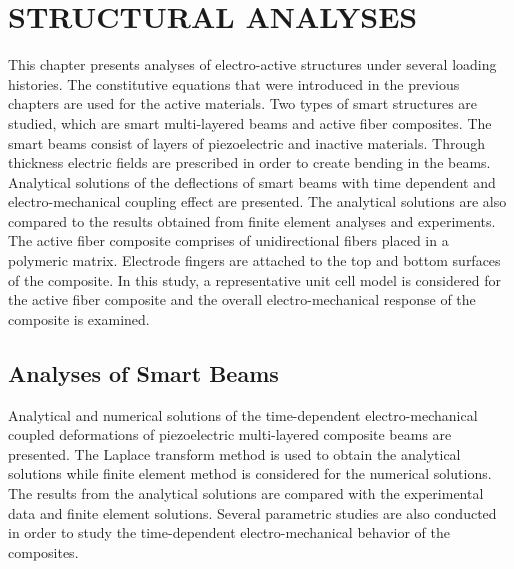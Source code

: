 %
%
%
\chapter{\uppercase{STRUCTURAL ANALYSES}}  
\label{section:structural_analyses}

This chapter presents analyses of electro-active structures under several loading histories.
The constitutive equations that were introduced in the previous chapters are used for the active materials.
Two types of smart structures are studied, which are smart multi-layered beams and active fiber composites.
The smart beams consist of layers of piezoelectric and inactive materials.
Through thickness electric fields are prescribed in order to create bending in the beams.
Analytical solutions of the deflections of smart beams with time dependent and electro-mechanical coupling effect are presented.
The analytical solutions are also compared to the results obtained from finite element analyses and experiments.
The active fiber composite comprises of unidirectional fibers placed in a polymeric matrix.
Electrode fingers are attached to the top and bottom surfaces of the composite.
In this study, a representative unit cell model is considered for the active fiber composite and the overall electro-mechanical response of the composite is examined. \\

\section{Analyses of Smart Beams}
Analytical and numerical solutions of the time-dependent electro-mechanical coupled deformations of piezoelectric multi-layered composite beams are presented. 
The Laplace transform method is used to obtain the analytical solutions while finite element method is considered for the numerical solutions.
The results from the analytical solutions are compared with the experimental data and finite element solutions.
Several parametric studies are also conducted in order to study the time-dependent electro-mechanical behavior of the composites.
\\



